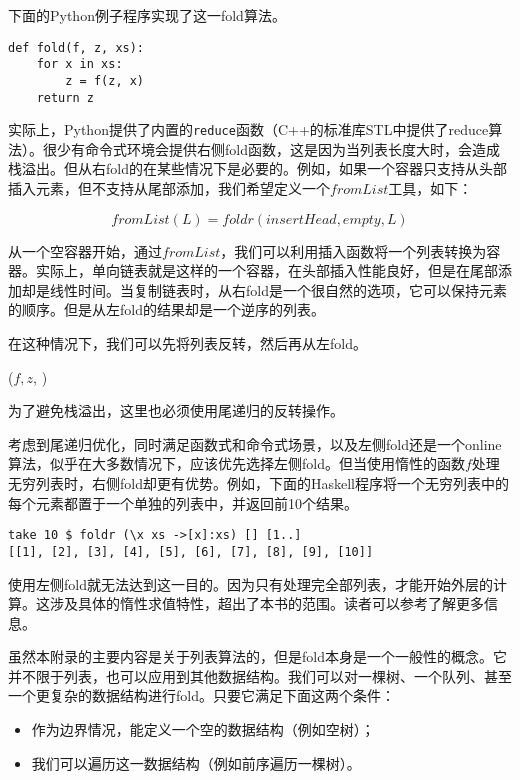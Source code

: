 \documentclass[b5paper]{ctexart}
\begin{document}
下面的Python例子程序实现了这一fold算法。

\lstset{language=Python}
\begin{lstlisting}
def fold(f, z, xs):
    for x in xs:
        z = f(z, x)
    return z
\end{lstlisting}

实际上，Python提供了内置的\texttt{reduce}函数（C++的标准库STL中提供了reduce算法）。很少有命令式环境会提供右侧fold函数，这是因为当列表长度大时，会造成栈溢出。但从右fold的在某些情况下是必要的。例如，如果一个容器只支持从头部插入元素，但不支持从尾部添加，我们希望定义一个$fromList$工具，如下：

\[
fromList(L) = foldr(insertHead, empty, L)
\]

从一个空容器开始，通过$fromList$，我们可以利用插入函数将一个列表转换为容器。实际上，单向链表就是这样的一个容器，在头部插入性能良好，但是在尾部添加却是线性时间。当复制链表时，从右fold是一个很自然的选项，它可以保持元素的顺序。但是从左fold的结果却是一个逆序的列表。

在这种情况下，我们可以先将列表反转，然后再从左fold。

\begin{algorithmic}[1]
  \State \Return {}($f, z$, )
\EndFunction
\end{algorithmic}

为了避免栈溢出，这里也必须使用尾递归的反转操作。

考虑到尾递归优化，同时满足函数式和命令式场景，以及左侧fold还是一个online算法，似乎在大多数情况下，应该优先选择左侧fold。但当使用惰性的函数$f$处理无穷列表时，右侧fold却更有优势。例如，下面的Haskell程序将一个无穷列表中的每个元素都置于一个单独的列表中，并返回前10个结果。

\lstset{language=Haskell}
\begin{lstlisting}[style=Haskell]
take 10 $ foldr (\x xs ->[x]:xs) [] [1..]
[[1], [2], [3], [4], [5], [6], [7], [8], [9], [10]]
\end{lstlisting} %

使用左侧fold就无法达到这一目的。因为只有处理完全部列表，才能开始外层的计算。这涉及具体的惰性求值特性，超出了本书的范围。读者可以参考\cite{Haskell-wiki}了解更多信息。

虽然本附录的主要内容是关于列表算法的，但是fold本身是一个一般性的概念。它并不限于列表，也可以应用到其他数据结构。我们可以对一棵树、一个队列、甚至一个更复杂的数据结构进行fold。只要它满足下面这两个条件：

\begin{itemize}
\item 作为边界情况，能定义一个空的数据结构（例如空树）；
\item 我们可以遍历这一数据结构（例如前序遍历一棵树）。
\end{itemize}
\end{document}
